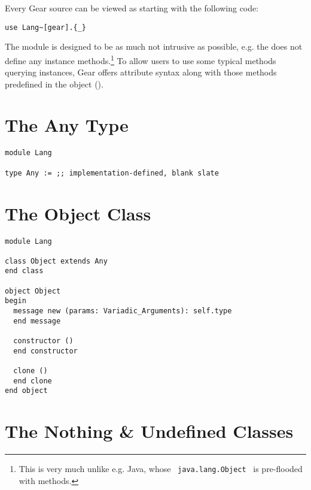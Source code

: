 Every Gear source can be viewed as starting with the following code:
\begin{lstlisting}
use Lang~[gear].{_}
\end{lstlisting}

The  module is designed to be as much not intrusive as possible, e.g. the  does not define any instance methods.\footnote{This is very much unlike e.g. Java, whose ~\lstinline!java.lang.Object!~ is pre-flooded with methods.} To allow users to use some typical methods querying  instances, Gear offers attribute syntax along with those methods predefined in the  object (). 




\section{The Any Type}
\label{sec:lang-any}

\begin{lstlisting}
module Lang

type Any := ;; implementation-defined, blank slate
\end{lstlisting}






\section{The Object Class}
\label{sec:lang-object}

\begin{lstlisting}
module Lang

class Object extends Any 
end class

object Object
begin
  message new (params: Variadic_Arguments): self.type 
  end message
  
  constructor ()
  end constructor
  
  clone ()
  end clone
end object
\end{lstlisting}






\section{The Nothing \& Undefined Classes}
\label{sec:lang-nothing}
\label{sec:lang-undefined}

